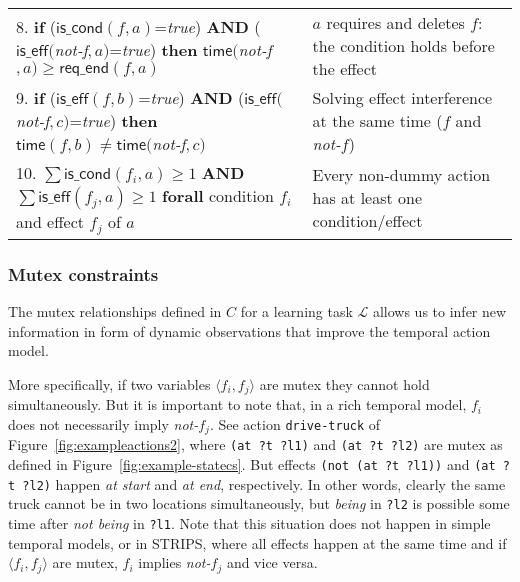 \documentclass{ecai}
\newcommand{\tup}[1]{{\langle #1 \rangle}}
\newcommand{\iscond}{\mathsf{is\_cond}}    %
\newcommand{\iseff}{\mathsf{is\_eff}}    %
\newcommand{\tim}{\mathsf{time}}   %
\newcommand{\reqe}{\mathsf{req\_{end}}}   %
\begin{document}
\begin{table*}
\begin{center}
\begin{scriptsize}
\begin{tabular}{p{10.4cm}p{6.6cm}}
8. \textbf{if} ($\iscond(f,a)$=\textit{true}) \textbf{AND} ($\iseff($\textit{not-f}$,a)$=\textit{true}) \textbf{then} $\tim($\textit{not-f}$,a) \geq \reqe(f,a)$ & $a$ requires and deletes $f$: the condition holds before the effect \\ 

9. \textbf{if} ($\iseff(f,b)$=\textit{true}) \textbf{AND} ($\iseff($\textit{not-f}$,c)$=\textit{true}) \textbf{then} $\tim(f,b) \neq \tim($\textit{not-f}$,c)$ & Solving effect interference at the same time ($f$ and \textit{not-}$f$) \\

10. $\sum \iscond(f_i,a) \geq 1$ \textbf{AND} $\sum \iseff(f_j,a) \geq 1$ \textbf{forall} condition $f_i$ and effect $f_j$ of $a$ & Every non-dummy action has at least one condition/effect \\

\end{tabular}
\end{scriptsize}	
\label{table:constraints}
\end{center}	
\end{table*}


\subsubsection{Mutex constraints}
The mutex relationships defined in $C$ for a learning task $\mathcal{L}$ allows us to infer new information in form of dynamic observations that improve the temporal action model.

More specifically, if two variables $\tup{f_i, f_j}$ are mutex they cannot hold simultaneously. But it is important to note that, in a rich temporal model, $f_i$ does not necessarily imply \textit{not-}$f_j$.
See action \texttt{drive-truck} of Figure~\ref{fig:exampleactions2}, where \texttt{(at ?t ?l1)} and \texttt{(at ?t ?l2)} are mutex as defined in Figure~\ref{fig:example-statecs}. But effects \texttt{(not (at ?t ?l1))} and \texttt{(at ?t ?l2)} happen \textit{at start} and \textit{at end}, respectively. In other words, clearly the same truck cannot be in two locations simultaneously, but \textit{being} in \texttt{?l2} is possible some time after \textit{not being} in \texttt{?l1}. Note that this situation does not happen in simple temporal models, or in STRIPS, where all effects happen at the same time and if $\tup{f_i, f_j}$ are mutex, $f_i$ implies \textit{not-}$f_j$ and vice versa.
\end{document}
